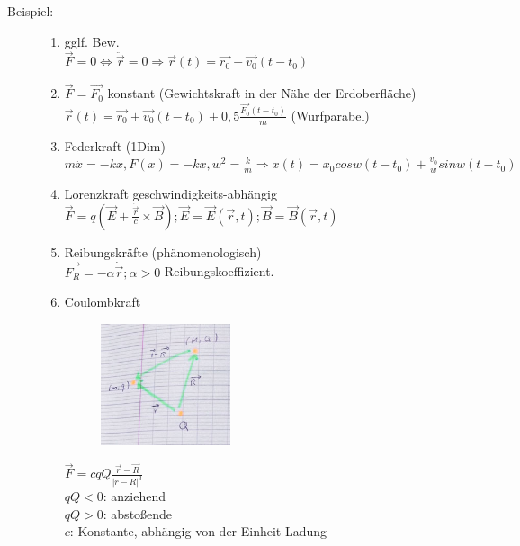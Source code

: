 \begin{description}
\item[Beispiel:]
\begin{enumerate}
\item gglf. Bew. \\
$\vec{F}=0 \Leftrightarrow \ddot{\vec{r}}=0 \Rightarrow \vec{r}(t) = \vec{r_0}+\vec{v_0}(t-t_0)$
\item $\vec{F}=\vec{F_0}$ konstant (Gewichtskraft in der Nähe der Erdoberfläche) \\
$\vec{r}(t)=\vec{r_0}+\vec{v_0}(t-t_0)+0,5 \frac{\vec{F_0}(t-t_0)}{m}$ (Wurfparabel)
\item Federkraft (1Dim) \\
$m\ddot{x}=-kx, F(x)=-kx, w^2=\frac{k}{m}\Rightarrow x(t)=x_0cosw(t-t_0)+\frac{v_0}{w}sinw(t-t_0)$
\item Lorenzkraft geschwindigkeits-abhängig \\
$\vec{F}=q(\vec{E}+\frac{\dot{\vec{r}}}{c}\times\vec{B}); \vec{E}=\vec{E}(\vec{r},t); \vec{B}=\vec{B}(\vec{r},t)$
\item Reibungskräfte (phänomenologisch) \\
$\vec{F_R}=-\alpha\dot{\vec{r}}; \alpha>0$ Reibungskoeffizient.
\item Coulombkraft\\
\begin{figure}[h]
\begin{center}
\includegraphics[width=0.4\textwidth]{Skizzen/Anhang2Kopie.jpg}
\end{center}
\caption{}
\end{figure}
$\vec{F}=cqQ\frac{\vec{r}-\vec{R}}{|r-R|^3}$\\
$qQ<0$: anziehend\\
$qQ>0$: abstoßende\\
$c$: Konstante, abhängig von der Einheit Ladung
\end{enumerate}
\end{description}
